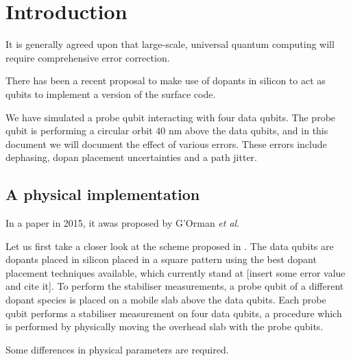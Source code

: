 
\section{Introduction} \label{sec:Introduction}
It is generally agreed upon that large-scale, universal quantum computing will require comprehensive error correction. 




There has been a recent proposal to make use of dopants in silicon to act as qubits \cite{the paper} to implement a version of the surface code. 


We have simulated a probe qubit interacting with four data qubits. The probe qubit is performing a circular orbit $40$ nm above the data qubits, and in this document we will document the effect of various errors. These errors include dephasing, dopan placement uncertainties and a path jitter. 

\subsection{A physical implementation}
In a paper in 2015, it awas proposed by G'Orman \textit{et al}. 

Let us first take a closer look at the scheme proposed in \cite{the paper}. The data qubits are dopants placed in silicon placed in a square pattern using the best dopant placement techniques available, which currently stand at [insert some error value and cite it]. To perform the stabiliser measurements, a probe qubit of a different dopant species is placed on a mobile slab above the data qubits. Each probe qubit performs a stabiliser measurement on four data qubits, a procedure which is performed by physically moving the overhead slab with the probe qubits. 

Some differences in physical parameters are required. 
